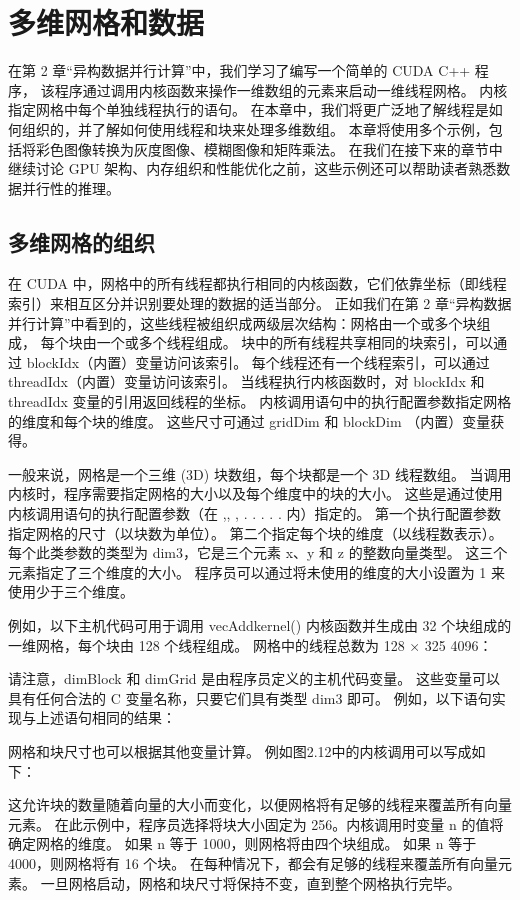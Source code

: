 \section{多维网格和数据}
在第 2 章“异构数据并行计算”中，我们学习了编写一个简单的 CUDA C++ 程序，
该程序通过调用内核函数来操作一维数组的元素来启动一维线程网格。 内核指定网格中每个单独线程执行的语句。 
在本章中，我们将更广泛地了解线程是如何组织的，并了解如何使用线程和块来处理多维数组。 
本章将使用多个示例，包括将彩色图像转换为灰度图像、模糊图像和矩阵乘法。 
在我们在接下来的章节中继续讨论 GPU 架构、内存组织和性能优化之前，这些示例还可以帮助读者熟悉数据并行性的推理。

\subsection{多维网格的组织}
在 CUDA 中，网格中的所有线程都执行相同的内核函数，它们依靠坐标（即线程索引）来相互区分并识别要处理的数据的适当部分。 
正如我们在第 2 章“异构数据并行计算”中看到的，这些线程被组织成两级层次结构：网格由一个或多个块组成，
每个块由一个或多个线程组成。 块中的所有线程共享相同的块索引，可以通过 blockIdx（内置）变量访问该索引。 
每个线程还有一个线程索引，可以通过 threadIdx（内置）变量访问该索引。 
当线程执行内核函数时，对 blockIdx 和 threadIdx 变量的引用返回线程的坐标。 
内核调用语句中的执行配置参数指定网格的维度和每个块的维度。 这些尺寸可通过 gridDim 和 blockDim （内置）变量获得。

一般来说，网格是一个三维 (3D) 块数组，每个块都是一个 3D 线程数组。 
当调用内核时，程序需要指定网格的大小以及每个维度中的块的大小。 
这些是通过使用内核调用语句的执行配置参数（在 ,, , . . . . . 内）指定的。 
第一个执行配置参数指定网格的尺寸（以块数为单位）。 第二个指定每个块的维度（以线程数表示）。 
每个此类参数的类型为 dim3，它是三个元素 x、y 和 z 的整数向量类型。 
这三个元素指定了三个维度的大小。 程序员可以通过将未使用的维度的大小设置为 1 来使用少于三个维度。

例如，以下主机代码可用于调用 vecAddkernel() 内核函数并生成由 32 个块组成的一维网格，每个块由 128 个线程组成。 
网格中的线程总数为 128 × 325 4096：

请注意，dimBlock 和 dimGrid 是由程序员定义的主机代码变量。 
这些变量可以具有任何合法的 C 变量名称，只要它们具有类型 dim3 即可。 例如，以下语句实现与上述语句相同的结果：

网格和块尺寸也可以根据其他变量计算。 例如图2.12中的内核调用可以写成如下：

这允许块的数量随着向量的大小而变化，以便网格将有足够的线程来覆盖所有向量元素。 
在此示例中，程序员选择将块大小固定为 256。内核调用时变量 n 的值将确定网格的维度。 
如果 n 等于 1000，则网格将由四个块组成。 如果 n 等于 4000，则网格将有 16 个块。 
在每种情况下，都会有足够的线程来覆盖所有向量元素。 一旦网格启动，网格和块尺寸将保持不变，直到整个网格执行完毕。

